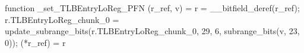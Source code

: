 function _set_TLBEntryLoReg_PFN (r_ref, v) = {
    r = __bitfield_deref(r_ref);
    r.TLBEntryLoReg_chunk_0 = update_subrange_bits(r.TLBEntryLoReg_chunk_0, 29, 6, subrange_bits(v, 23, 0));
    (*r_ref) = r
}
